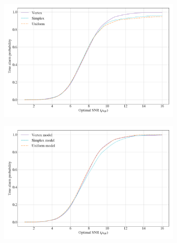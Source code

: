 \documentclass[12pt]{iopart}
\begin{document}
\begin{figure}[t!] %
\begin{subfigure}{0.48\textwidth}
\includegraphics[width=\linewidth]{figures/conditional_trained.png}
\caption{}\label{fig:a}
\end{subfigure}\hspace*{\fill}
\begin{subfigure}{0.48\textwidth}
\includegraphics[width=\linewidth]{figures/efficiency_curve_vtest.png}
\caption{}\label{fig:b}
\end{subfigure}


\end{figure}
\end{document}
